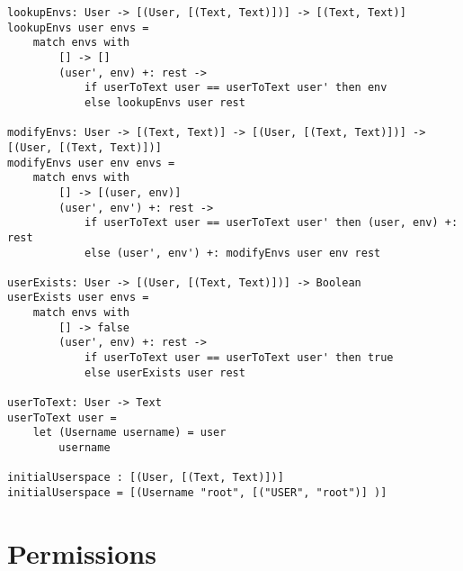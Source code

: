 \documentclass[logo,bsc,singlespacing,parskip]{infthesis}
\begin{document}
\begin{lstlisting}[language=unison]
lookupEnvs: User -> [(User, [(Text, Text)])] -> [(Text, Text)]
lookupEnvs user envs =
    match envs with
        [] -> []
        (user', env) +: rest ->
            if userToText user == userToText user' then env
            else lookupEnvs user rest

modifyEnvs: User -> [(Text, Text)] -> [(User, [(Text, Text)])] -> [(User, [(Text, Text)])]
modifyEnvs user env envs =
    match envs with
        [] -> [(user, env)]
        (user', env') +: rest ->
            if userToText user == userToText user' then (user, env) +: rest
            else (user', env') +: modifyEnvs user env rest

userExists: User -> [(User, [(Text, Text)])] -> Boolean
userExists user envs =
    match envs with
        [] -> false
        (user', env) +: rest ->
            if userToText user == userToText user' then true
            else userExists user rest

userToText: User -> Text
userToText user = 
    let (Username username) = user
        username

initialUserspace : [(User, [(Text, Text)])]
initialUserspace = [(Username "root", [("USER", "root")] )]
\end{lstlisting}

\section{Permissions}
\end{document}

